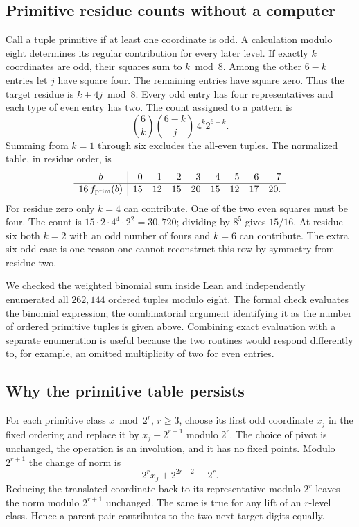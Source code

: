 \documentclass[12pt,letterpaper]{article}
\begin{document}
\clearpage\subsection{Primitive residue counts without a computer}
Call a tuple primitive if at least one coordinate is odd. A calculation modulo eight determines its regular contribution for every later level. If exactly \(k\) coordinates are odd, their squares sum to \(k\bmod8\). Among the other \(6-k\) entries let \(j\) have square four. The remaining entries have square zero. Thus the target residue is \(k+4j\bmod8\). Every odd entry has four representatives and each type of even entry has two. The count assigned to a pattern is
\[
 \binom6k\binom{6-k}{j}\,4^k 2^{6-k}.
\]
Summing from \(k=1\) through six excludes the all-even tuples. The normalized table, in residue order, is
\[
\begin{array}{c|rrrrrrrr}
 b &0&1&2&3&4&5&6&7\\\hline
 16\,f_{\rm prim}(b)&15&12&15&20&15&12&17&20 .
\end{array}
\]
For residue zero only \(k=4\) can contribute. One of the two even squares must be four. The count is \(15\cdot2\cdot4^4\cdot2^2=30{,}720\); dividing by \(8^5\) gives \(15/16\). At residue six both \(k=2\) with an odd number of fours and \(k=6\) can contribute. The extra six-odd case is one reason one cannot reconstruct this row by symmetry from residue two.

We checked the weighted binomial sum inside Lean and independently enumerated all \(262{,}144\) ordered tuples modulo eight. The formal check evaluates the binomial expression; the combinatorial argument identifying it as the number of ordered primitive tuples is given above. Combining exact evaluation with a separate enumeration is useful because the two routines would respond differently to, for example, an omitted multiplicity of two for even entries.

\clearpage\subsection{Why the primitive table persists}
For each primitive class \(x\bmod2^r\), \(r\ge3\), choose its first odd coordinate \(x_j\) in the fixed ordering and replace it by \(x_j+2^{r-1}\) modulo \(2^r\). The choice of pivot is unchanged, the operation is an involution, and it has no fixed points. Modulo \(2^{r+1}\) the change of norm is
\[
       2^r x_j+2^{2r-2}\equiv 2^r .
\]
Reducing the translated coordinate back to its representative modulo \(2^r\) leaves the norm modulo \(2^{r+1}\) unchanged. The same is true for any lift of an \(r\)-level class. Hence a parent pair contributes to the two next target digits equally.
\end{document}
